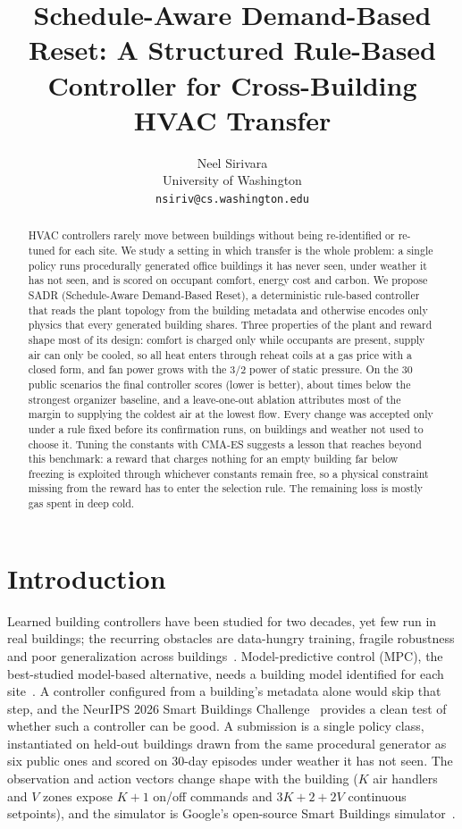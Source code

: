 \documentclass{article}
\title{Schedule-Aware Demand-Based Reset: A Structured Rule-Based Controller for Cross-Building HVAC Transfer}
\author{%
  Neel Sirivara\\
  University of Washington\\
  \texttt{nsiriv@cs.washington.edu}
}
\begin{document}
\maketitle

\begin{abstract}
HVAC controllers rarely move between buildings without being re-identified or re-tuned for each site. We study a setting in which transfer is the whole problem: a single policy runs procedurally generated office buildings it has never seen, under weather it has not seen, and is scored on occupant comfort, energy cost and carbon. We propose SADR (Schedule-Aware Demand-Based Reset), a deterministic rule-based controller that reads the plant topology from the building metadata and otherwise encodes only physics that every generated building shares. Three properties of the plant and reward shape most of its design: comfort is charged only while occupants are present, supply air can only be cooled, so all heat enters through reheat coils at a gas price with a closed form, and fan power grows with the 3/2 power of static pressure. On the 30 public scenarios the final controller scores \FinPub{} (lower is better), about \FinPwTimes{} times below the strongest organizer baseline, and a leave-one-out ablation attributes most of the margin to supplying the coldest air at the lowest flow. Every change was accepted only under a rule fixed before its confirmation runs, on buildings and weather not used to choose it. Tuning the constants with CMA-ES suggests a lesson that reaches beyond this benchmark: a reward that charges nothing for an empty building far below freezing is exploited through whichever constants remain free, so a physical constraint missing from the reward has to enter the selection rule. The remaining loss is mostly gas spent in deep cold.
\end{abstract}

\section{Introduction}

Learned building controllers have been studied for two decades, yet few run in real buildings; the recurring obstacles are data-hungry training, fragile robustness and poor generalization across buildings~\citep{wang2020rl}. Model-predictive control (MPC), the best-studied model-based alternative, needs a building model identified for each site~\citep{oldewurtel2012mpc,drgona2020mpc}. A controller configured from a building's metadata alone would skip that step, and the NeurIPS 2026 Smart Buildings Challenge~\citep{sb26kit} provides a clean test of whether such a controller can be good. A submission is a single policy class, instantiated on held-out buildings drawn from the same procedural generator as six public ones and scored on 30-day episodes under weather it has not seen. The observation and action vectors change shape with the building ($K$ air handlers and $V$ zones expose $K{+}1$ on/off commands and $3K{+}2{+}2V$ continuous setpoints), and the simulator is Google's open-source Smart Buildings simulator~\citep{goldfeder2023lightweight,goldfeder2025suite}.
\end{document}
